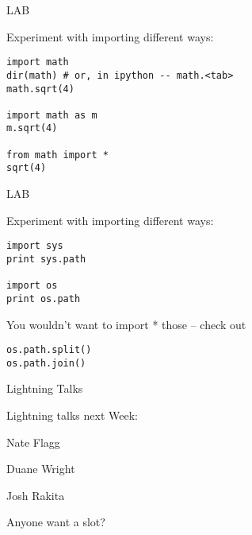 \documentclass{beamer}
\begin{document}
\begin{frame}[fragile]{LAB}

{\Large  Experiment with importing different ways:}
\begin{verbatim}
import math
dir(math) # or, in ipython -- math.<tab>
math.sqrt(4)

import math as m
m.sqrt(4)

from math import *
sqrt(4)
\end{verbatim}

\end{frame}

\begin{frame}[fragile]{LAB}

{\Large  Experiment with importing different ways:}
\begin{verbatim}
import sys
print sys.path

import os
print os.path
\end{verbatim}
{\Large You wouldn't want to import * those -- check out}
\begin{verbatim}
os.path.split()
os.path.join()
\end{verbatim}

\end{frame}

\begin{frame}[fragile]{Lightning Talks}

\vfill
{\LARGE Lightning talks next Week:}

\vfill
{\Large
Nate Flagg

\vfill
Duane Wright

\vfill
Josh Rakita

\vfill
Anyone want a slot?
}
\vfill

\end{frame}
\end{document}

